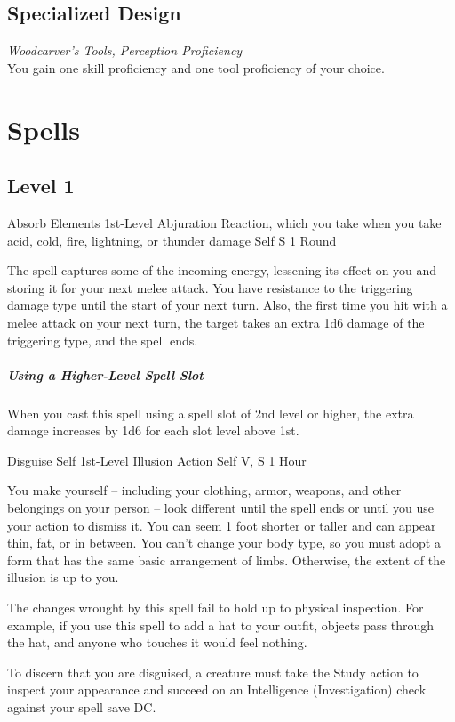 \documentclass[letterpaper,openany,oneside,twocolumn]{book}
\begin{document}
\subsection*{Specialized Design}
\textit{Woodcarver's Tools, Perception Proficiency}\\
You gain one skill proficiency and one tool proficiency of your choice.

\section*{Spells}
\subsection*{Level 1}

\DndSpellHeader
  {Absorb Elements}
  {1st-Level Abjuration}
  {Reaction, which you take when you take acid, cold, fire, lightning, or thunder damage}
  {Self}
  {S}
  {1 Round}

The spell captures some of the incoming energy, lessening its effect on you and storing it for your next melee attack. You have resistance to the triggering damage type until the start of your next turn. Also, the first time you hit with a melee attack on your next turn, the target takes an extra 1d6 damage of the triggering type, and the spell ends.

\subparagraph*{Using a Higher-Level Spell Slot} When you cast this spell using a spell slot of 2nd level or higher, the extra damage increases by 1d6 for each slot level above 1st.

\DndSpellHeader
  {Disguise Self}
  {1st-Level Illusion}
  {Action}
  {Self}
  {V, S}
  {1 Hour}

You make yourself – including your clothing, armor, weapons, and other belongings on your person – look different until the spell ends or until you use your action to dismiss it. You can seem 1 foot shorter or taller and can appear thin, fat, or in between. You can't change your body type, so you must adopt a form that has the same basic arrangement of limbs. Otherwise, the extent of the illusion is up to you.

The changes wrought by this spell fail to hold up to physical inspection. For example, if you use this spell to add a hat to your outfit, objects pass through the hat, and anyone who touches it would feel nothing.

To discern that you are disguised, a creature must take the Study action to inspect your appearance and succeed on an Intelligence (Investigation) check against your spell save DC.
\end{document}
